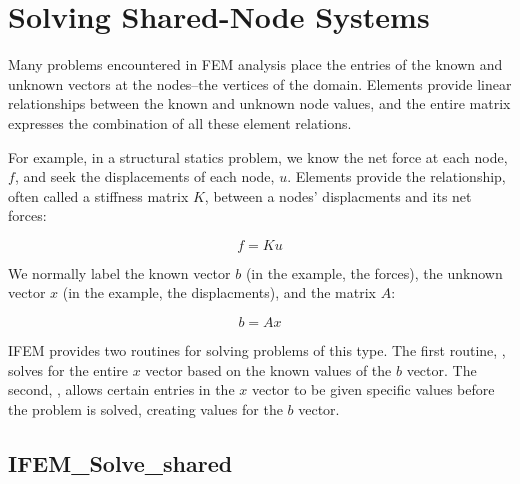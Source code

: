 \documentclass[10pt]{article}
\begin{document}
\section{Solving Shared-Node Systems}

Many problems encountered in FEM analysis place the entries of the
known and unknown vectors at the nodes--the vertices of the domain.
Elements provide linear relationships between the known and unknown node values, 
and the entire matrix expresses the combination of all these element relations.

For example, in a structural statics problem, we know the net force at
each node, $f$, and seek the displacements of each node, $u$.  Elements 
provide the relationship, often called a stiffness matrix $K$, between 
a nodes' displacments and its net forces:

\[
	f=K u
\]

We normally label the known vector $b$ (in the example, the forces), the unknown
vector $x$ (in the example, the displacments), and the matrix $A$:

\[
	b=A x
\]


IFEM provides two routines for solving problems of this type.  The first routine, , solves for the entire $x$ vector based on the known values of the $b$ vector.  The second, , allows certain entries in the $x$ vector to be given specific values before the problem is solved, creating values for the $b$ vector.


\newpage
\subsection{IFEM\_Solve\_shared}

\end{document}
